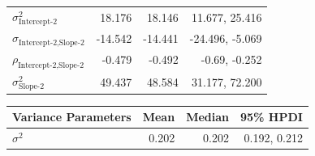 \begin{table}[htb]
\begin{tabular}{@{}lrrr@{}}
$\sigma^2_\text{Intercept-2}$ & 18.176 & 18.146 & 11.677, 25.416\\
$\sigma_{\text{Intercept-2}, \text{Slope-2}}$ & -14.542 & -14.441 & -24.496, -5.069\\
$\rho_{\text{Intercept-2}, \text{Slope-2}}$ & -0.479 & -0.492 & -0.69, -0.252\\
$\sigma^2_\text{Slope-2}$ & 49.437 & 48.584 & 31.177, 72.200\\ \bottomrule
\end{tabular}

\begin{tabular}{@{}lrrr@{}}
\toprule
Variance Parameters & Mean & Median & 95\% HPDI \\ \midrule
$\sigma^2$ & 0.202 & 0.202 & 0.192, 0.212\\ \bottomrule
\end{tabular}
\end{table}


